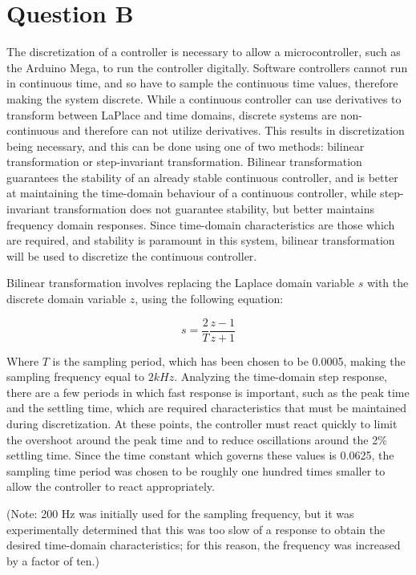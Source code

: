 \documentclass[11pt, letterpaper]{article}
\begin{document}
\clearpage
\clearpage
\section{Question B}

The discretization of a controller is necessary to allow a microcontroller, such as the Arduino Mega,
to run the controller digitally. Software controllers cannot run in continuous time, and so have
to sample the continuous time values, therefore making the system discrete. While a continuous controller
can use derivatives to transform between LaPlace and time domains, discrete systems are non-continuous
and therefore can not utilize derivatives. This results in discretization being necessary, and this
can be done using one of two methods: bilinear transformation or step-invariant transformation.
Bilinear transformation guarantees the stability of an already stable continuous controller, and
is better at maintaining the time-domain behaviour of a continuous controller, while
step-invariant transformation does not guarantee stability, but better maintains frequency domain
responses. Since time-domain characteristics are those which are required, and stability is
paramount in this system, bilinear transformation will be used to discretize the continuous
controller. \par

Bilinear transformation involves replacing the Laplace domain variable $s$ with the discrete domain
variable $z$, using the following equation:

\begin{equation}
    \label{eq:bilinear-transform}
    s = \frac{2}{T}\frac{z-1}{z+1}
\end{equation}

Where $T$ is the sampling period, which has been chosen to be 0.0005, making the sampling frequency equal
to $2kHz$. Analyzing the time-domain step response, there are a few periods in which fast response is
important, such as the peak time
and the settling time, which are required characteristics that must be maintained during discretization.
At these points, the controller must react quickly to limit the overshoot around the peak time
and to reduce oscillations around the 2\% settling time. Since the time constant which governs these values
is 0.0625, the sampling time period was chosen to be roughly one hundred times smaller to allow the controller to
react appropriately. \par
(Note: 200 Hz was initially used for the sampling frequency, but it was experimentally determined that this was too slow of
a response to obtain the desired time-domain characteristics; for this reason, the frequency was increased by a factor of ten.)
\end{document}
